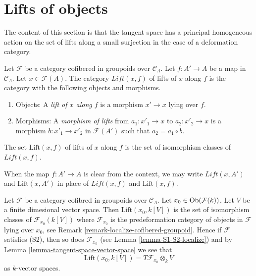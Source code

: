 \section{Lifts of objects}
\label{section-lifts}

\noindent
The content of this section is that the tangent space has a principal
homogeneous action on the set of lifts along a small surjection
in the case of a deformation category.

\begin{definition}
\label{definition-lifts}
Let $\mathcal{F}$ be a category cofibered in groupoids over
$\mathcal{C}_\Lambda$. Let $f: A' \to A$ be a map in $\mathcal{C}_\Lambda$.
Let $x \in \mathcal{F}(A)$. The category $\textit{Lift}(x, f)$ of lifts of $x$
along $f$ is the category with the following objects and
morphisms.
\begin{enumerate}
\item Objects: A {\it lift of $x$ along $f$} is a morphism $x' \to x$
lying over $f$.
\item Morphisms: A {\it morphism of lifts} from $a_1 : x'_1 \to x$ to
$a_2 : x'_2 \to x$ is a morphism $b : x'_1 \to x'_2$ in
$\mathcal{F}(A')$ such that $a_2 = a_1 \circ b$.
\end{enumerate}
The set $\text{Lift}(x, f)$ of lifts of $x$ along $f$ is the set of
isomorphism classes of $\textit{Lift}(x, f)$.
\end{definition}

\begin{remark}
\label{remark-omit-arrow}
When the map $f: A' \to A$ is clear from the context, we may write
$\textit{Lift}(x, A')$ and $\text{Lift}(x, A')$ in place of
$\textit{Lift}(x, f)$ and $\text{Lift}(x, f)$.
\end{remark}

\begin{remark}
\label{remark-tangent-space-lifting}
Let $\mathcal{F}$ be a category cofibred in groupoids over
$\mathcal{C}_\Lambda$. Let $x_0 \in \mathop{\rm Ob}\nolimits(\mathcal{F}(k))$.
Let $V$ be a finite dimesional vector space.
Then $\text{Lift}(x_0, k[V])$ is the set of isomorphism classes
of $\mathcal{F}_{x_0}(k[V])$ where $\mathcal{F}_{x_0}$ is the
predeformation category of objects in $\mathcal{F}$ lying over
$x_0$, see
Remark \ref{remark-localize-cofibered-groupoid}.
Hence if $\mathcal{F}$ satisfies (S2), then so does
$\mathcal{F}_{x_0}$ (see
Lemma \ref{lemma-S1-S2-localize})
and by
Lemma \ref{lemma-tangent-space-vector-space}
we see that
$$
\text{Lift}(x_0, k[V]) = T\mathcal{F}_{x_0} \otimes_k V
$$
as $k$-vector spaces.
\end{remark}

